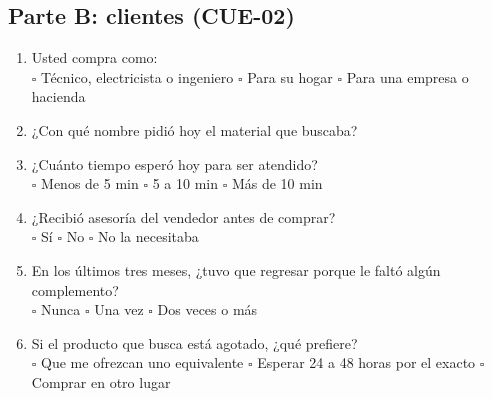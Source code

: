 \subsection*{Parte B: clientes (CUE-02)}

\begin{enumerate}[label=B\arabic*., leftmargin=*]
\item Usted compra como:\\
$\square$ Técnico, electricista o ingeniero \quad $\square$ Para su hogar \quad $\square$ Para una empresa o hacienda
\item ¿Con qué nombre pidió hoy el material que buscaba? \hrulefill
\item ¿Cuánto tiempo esperó hoy para ser atendido?\\
$\square$ Menos de 5 min \quad $\square$ 5 a 10 min \quad $\square$ Más de 10 min
\item ¿Recibió asesoría del vendedor antes de comprar?\\
$\square$ Sí \quad $\square$ No \quad $\square$ No la necesitaba
\item En los últimos tres meses, ¿tuvo que regresar porque le faltó algún complemento?\\
$\square$ Nunca \quad $\square$ Una vez \quad $\square$ Dos veces o más
\item Si el producto que busca está agotado, ¿qué prefiere?\\
$\square$ Que me ofrezcan uno equivalente \quad $\square$ Esperar 24 a 48 horas por el exacto \quad $\square$ Comprar en otro lugar
\end{enumerate}
